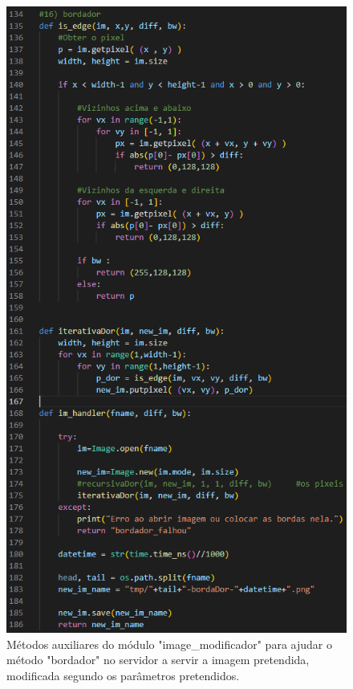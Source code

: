 \documentclass{report}
\begin{document}
    \begin{figure}[!hbtp]
        \centering
        \includegraphics[scale=0.62]{Images_code/13 - image manipulation app2 bordador.png}
        \caption{\label{Estrutura}Métodos auxiliares do módulo "image\_modificador" para ajudar o método "bordador" no servidor a servir a imagem pretendida, modificada segundo os parâmetros pretendidos.}
\end{figure}
\end{document}
